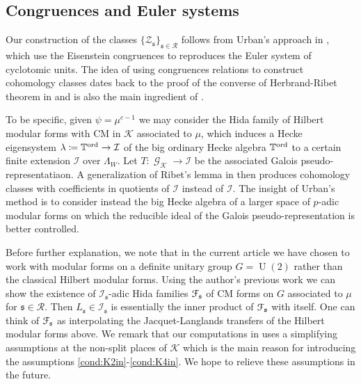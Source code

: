 \documentclass[leqno]{amsart}
\theoremstyle{definition}
\theoremstyle{remark}
\DeclareMathOperator{\UU}{U}
\DeclareMathOperator{\Gal}{\mathcal{G}}
\newcommand{\fs}{\mathfrak{s}}
\newcommand{\K}{{\mathcal{K}}} %
\newcommand{\TT}{\mathbb{T}} %
\newcommand{\euF}{\EuScript{F}} %
\newcommand{\I}{\mathcal{I}} %
\newcommand{\ord}{\textnormal{ord}} %
\begin{document}
\subsection*{Congruences and Euler systems}

Our construction of the classes $\{\mathcal{Z}_\fs\}_{\fs\in\mathcal{R}}$
follows from Urban's approach in \cite{urban},
which use the Eisenstein congruences 
to reproduces the Euler system of cyclotomic units.
The idea of using congruences relations to construct cohomology classes
dates back to the proof of the converse of
Herbrand-Ribet theorem in \cite{Ribet1976}
and is also the main ingredient of \cite{HT93}.

To be specific,
given $\psi=\mu^{c-1}$ we may 
consider the Hida family of Hilbert modular forms
with CM in $\K$ associated to $\mu$,
which induces a Hecke eigensystem
$\lambda\coloneqq \TT^{\ord}\to \I$
of the big ordinary Hecke algebra $\TT^{\ord}$
to a certain finite extension $\I$ over $\Lambda_W$.
Let $T\colon \Gal_\K\to \I$ be the associated 
Galois pseudo-representatiaon.
A generalization of Ribet's lemma in \cite{Ribet1976}
then produces cohomology classes
with coefficients in quotients of $\I$ instead of $\I$.
The insight of Urban's method is to consider instead
the big Hecke algebra of a larger space of $p$-adic modular forms
on which the reducible ideal of 
the Galois pseudo-representation is better controlled.

Before further explanation,
we note that in the current article 
we have chosen to work with 
modular forms on a definite unitary group $G=\UU(2)$
rather than the classical Hilbert modular forms.
Using the author's previous work \cite{lee}
we can show the existence of $\I_\fs$-adic Hida families $\euF_\fs$
of CM forms on $G$ associated to $\mu$ for $\fs\in\mathcal{R}$.
Then $L_\fs\in \I_\fs$ is essentially the inner product 
of $\euF_\fs$ with itself.
One can think of $\euF_\fs$ as interpolating the Jacquet-Langlands
transfers of the Hilbert modular forms above.
We remark that our computations in \cite{lee}
uses a simplifying assumptions at the non-split places of $\K$
which is the main reason for introducing
the assumptions \ref{cond:K2in}-\ref{cond:K4in}.
We hope to relieve these assumptions in the future.
\end{document}
